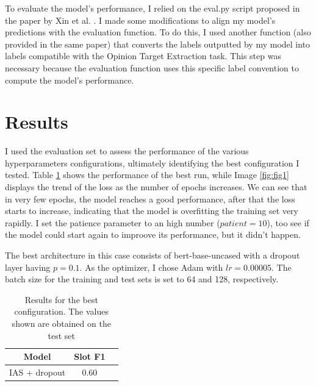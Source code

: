 \documentclass[a4paper]{article}
\begin{document}
To evaluate the model’s performance, I relied on the eval.py script proposed in the paper by Xin et al. \cite{li2019unifiedmodelopiniontarget}.
I made some modifications to align my model’s predictions with the evaluation function. To do this, I used another function (also provided in the same paper) that converts the labels outputted by my model into labels compatible with the Opinion Target Extraction task. This step was necessary because the evaluation function uses this specific label convention to compute the model’s performance.


\section{Results}
I used the evaluation set to assess the performance of the various hyperparameters configurations, ultimately identifying the best configuration I tested.
Table \ref{tab:results1} shows the performance of the best run, while Image \ref{fig:fig1} displays the trend of the loss as the number of epochs increases.
We can see that in very few epochs, the model reaches a good performance, after that the loss starts to increase, indicating that the model is overfitting the training set very rapidly.
I set the patience parameter to an high number (\(patient=10\)), too see if the model could start again to improove its performance, but it didn't happen.

The best architecture in this case consists of bert-base-uncased with a dropout layer having \(p=0.1\). As the optimizer, I chose Adam with \(lr=0.00005\). The batch size for the training and test sets is set to 64 and 128, respectively.


\begin{table}[h]
  \centering
  \begin{tabular}{|c|c|c|}
    \hline
    \textbf{Model} & \textbf{Slot F1} \\
    \hline
    IAS + dropout & 0.60 \\
    \hline
  \end{tabular}
  \caption{Results for the best configuration. The values shown are obtained on the test set}
  \label{tab:results1}

\end{table}
\end{document}
